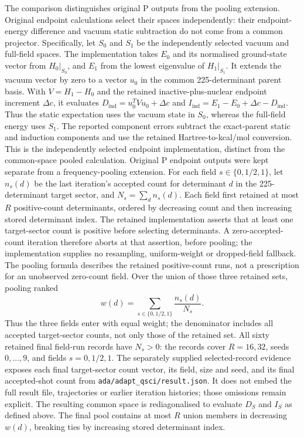 \documentclass{article}
\begin{document}
The comparison distinguishes original P outputs from the pooling extension. Original endpoint calculations select their spaces independently: their endpoint-energy difference and vacuum static subtraction do not come from a common projector. Specifically, let \(S_0\) and \(S_1\) be the independently selected vacuum and full-field spaces. The implementation takes \(E_0\) and its normalised ground-state vector from \(H_0|_{S_0}\), and \(E_1\) from the lowest eigenvalue of \(H_1|_{S_1}\). It extends the vacuum vector by zero to a vector \(u_0\) in the common 225-determinant parent basis. With \(V=H_1-H_0\) and the retained inactive-plus-nuclear endpoint increment \(\Delta c\), it evaluates \(D_{\mathrm{ind}}=u_0^{T}Vu_0+\Delta c\) and \(I_{\mathrm{ind}}=E_1-E_0+\Delta c-D_{\mathrm{ind}}\). Thus the static expectation uses the vacuum state in \(S_0\), whereas the full-field energy uses \(S_1\). The reported component errors subtract the exact-parent static and induction components and use the retained Hartree-to-kcal/mol conversion. This is the independently selected endpoint implementation, distinct from the common-space pooled calculation. Original P endpoint outputs were kept separate from a frequency-pooling extension. For each field \(s\in\{0,1/2,1\}\), let \(n_s(d)\) be the last iteration's accepted count for determinant \(d\) in the 225-determinant target sector, and \(N_s=\sum_d n_s(d)\). Each field first retained at most \(R\) positive-count determinants, ordered by decreasing count and then increasing stored determinant index. The retained implementation asserts that at least one target-sector count is positive before selecting determinants. A zero-accepted-count iteration therefore aborts at that assertion, before pooling; the implementation supplies no resampling, uniform-weight or dropped-field fallback. The pooling formula describes the retained positive-count runs, not a prescription for an unobserved zero-count field. Over the union of those three retained sets, pooling ranked
\[
 w(d)=\sum_{s\in\{0,1/2,1\}}\frac{n_s(d)}{N_s}.
\]
Thus the three fields enter with equal weight; the denominator includes all accepted target-sector counts, not only those of the retained set. All sixty retained final field-run records have \(N_s>0\): the records cover \(R=16,32\), seeds \(0,\ldots,9\), and fields \(s=0,1/2,1\). The separately supplied selected-record evidence exposes each final target-sector count vector, its field, size and seed, and its final accepted-shot count from \texttt{ada/adapt\_qsci/result.json}. It does not embed the full result file, trajectories or earlier iteration histories; those omissions remain explicit. The resulting common space is rediagonalised to evaluate \(D_S\) and \(I_S\) as defined above. The final pool contains at most \(R\) union members in decreasing \(w(d)\), breaking ties by increasing stored determinant index.
\end{document}
